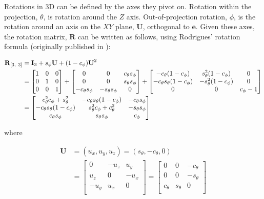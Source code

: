 Rotations in 3D can be defined by the axes they pivot on. Rotation
within the projection, \(\theta\), is rotation around the \(Z\) axis.
Out-of-projection rotation, \(\phi\), is the rotation around an axis on
the \(XY\) plane, \(\textbf{U}\), orthogonal to \(\textbf{e}\). Given
these axes, the rotation matrix, \(\textbf{R}\) can be written as
follows, using Rodrigues' rotation formula (originally published in
\citet{rodrigues_lois_1840}):

\begin{align*}
    \textbf{R}_{[3,~3]} 
    &= \textbf{I}_3 + s_\phi\*\textbf{U} + (1-c_\phi)\*\textbf{U}^2 \\
        &=
    \begin{bmatrix}
      1 & 0 & 0 \\ 
      0 & 1 & 0 \\ 
      0 & 0 & 1 \\
    \end{bmatrix} +
    \begin{bmatrix}
      0 & 0 & c_\theta s_\phi \\
      0 & 0 & s_\theta s_\phi \\
      -c_\theta s_\phi & -s_\theta s_\phi & 0 \\
    \end{bmatrix} +
    \begin{bmatrix}
      -c_\theta (1-c_\phi) & s^2_\theta (1-c_\phi) & 0 \\
      -c_\theta s_\theta (1-c_\phi) & -s^2_\theta (1-c_\phi) & 0 \\
      0 & 0 & c_\phi-1 \\
    \end{bmatrix} \\
    &= 
    \begin{bmatrix}
      c_\theta^2 c_\phi + s_\theta^2 &
      -c_\theta s_\theta (1 - c_\phi) &
      -c_\theta s_\phi \\
      -c_\theta s_\theta (1 - c_\phi) &
      s_\theta^2 c_\phi + c_\theta^2 &
      -s_\theta s_\phi \\
      c_\theta s_\phi &
      s_\theta s_\phi &
      c_\phi
    \end{bmatrix} \\
\end{align*}

\noindent where

\begin{align*}
  \textbf{U} &= (u_x, u_y, u_z) =
  (s_\theta, -c_\theta, 0) \\ 
  &=
  \begin{bmatrix}
  0 & -u_z & u_y  \\
  u_z & 0 & -u_x \\
  -u_y & u_x & 0 \\
  \end{bmatrix} =
  \begin{bmatrix}
    0 & 0 & -c_\theta \\
    0 & 0 & -s_\theta \\
    c_\theta & s_\theta & 0 \\
  \end{bmatrix} \\
  \end{align*}

